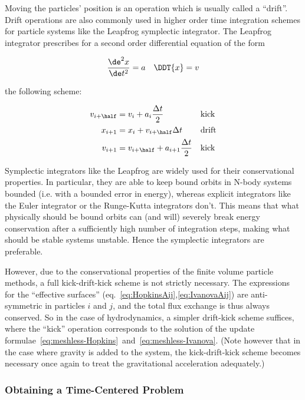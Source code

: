 Moving the particles' position is an operation which is usually called a ``drift''. Drift
operations are also commonly used in higher order time integration schemes for particle systems
like the Leapfrog symplectic integrator. The Leapfrog integrator prescribes for a second order
differential equation of the form

\begin{align}
    \frac{\de ^2 x}{\de t ^2} = a && \DDT{x} = v
\end{align}

the following scheme:

\begin{align}
    v_{i+\half} &= v_i + a_i \frac{\Delta t}{2}  && \text{kick} \\
    x_{i+1} &= x_i + v_{i+\half} \Delta t  && \text{drift} \\
    v_{i+1} &= v_{i + \half} + a_{i+1} \frac{\Delta t}{2}  && \text{kick}
\end{align}

Symplectic integrators like the Leapfrog are widely used for their conservational properties. In
particular, they are able to keep bound orbits in N-body systems bounded (i.e.  with a bounded
error in energy), whereas explicit integrators like the Euler integrator or the Runge-Kutta
integrators don't. This means that what physically should be bound orbits can (and will) severely
break energy conservation after a sufficiently high number of integration steps, making what should
be stable systems unstable. Hence the symplectic integrators are preferable.

However, due to the conservational properties of the finite volume particle methods, a full
kick-drift-kick scheme is not strictly necessary. The expressions for the ``effective surfaces''
\Aij (eq.~\ref{eq:HopkinsAij},\ref{eq:IvanovaAij}) are anti-symmetric in particles $i$ and $j$, and
the total flux exchange is thus always conserved. So in the case of hydrodynamics, a simpler
drift-kick scheme suffices, where the ``kick'' operation corresponds to the solution of the update
formulae~\ref{eq:meshless-Hopkins}~and~\ref{eq:meshless-Ivanova}. (Note however that in the case
where gravity is added to the system, the kick-drift-kick scheme becomes necessary once again to
treat the gravitational acceleration adequately.)




\subsubsection{Obtaining a Time-Centered Problem}

